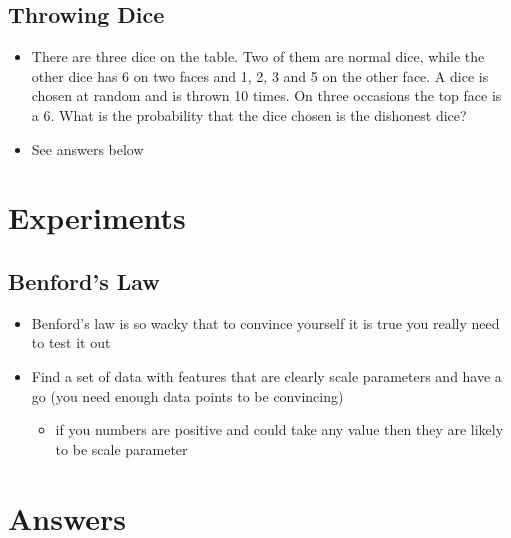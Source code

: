 \documentclass[11pt]{article}
\begin{document}
\subsection{Throwing Dice}
\label{sec:org6b30a08}
\begin{itemize}
\item There are three dice on the table.  Two of them are normal dice,
while the other dice has 6 on two faces and 1, 2, 3 and 5 on the other
face.  A dice is chosen at random and is thrown 10 times.  On three
occasions the top face is a 6.  What is the probability that the dice
chosen is the dishonest dice?
\item See answers below
\end{itemize}


\section{Experiments}
\label{sec:org8c4aea5}

\subsection{Benford's Law}
\label{sec:org176075f}
\begin{itemize}
\item Benford's law is so wacky that to convince yourself it is true
you really need to test it out
\item Find a set of data with features that are clearly scale
parameters and have a go (you need enough data points to be
convincing)
\begin{itemize}
\item if you numbers are positive and could take any value then they
are likely to be scale parameter
\end{itemize}
\end{itemize}

\section{Answers}
\label{sec:orgfa6a528}
\end{document}
